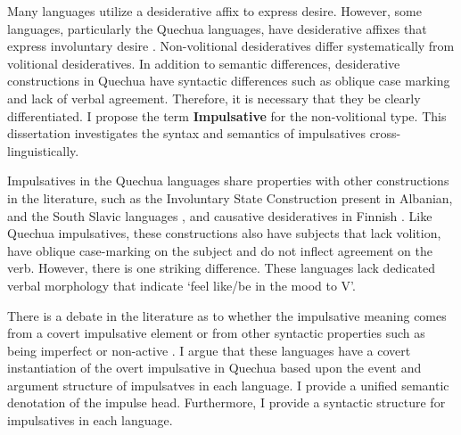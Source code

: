 \begin{front}



Many languages utilize a desiderative affix to express desire. However, some languages, particularly the Quechua languages, have desiderative affixes that express involuntary desire \citep*{Hermon:1985, Cole:1985, Jake:1978}.  Non-volitional desideratives differ systematically from volitional desideratives.  In addition to semantic differences, desiderative constructions in Quechua have syntactic differences such as   oblique case marking and lack of verbal agreement.  Therefore, it is necessary that they be clearly differentiated.  I propose the term { \bf Impulsative} for the non-volitional type.  This dissertation investigates the syntax and semantics of impulsatives cross-linguistically.  


Impulsatives in the Quechua languages share properties with other constructions in the literature, such as the Involuntary State Construction \citep*{Rivero:2009} present in Albanian\citep*{Kallulli:2006},  and the South Slavic languages \citep*{Murasic:2006, Rivero:2004, Franks:1995}, and causative desideratives in Finnish  \citep*{Pylkkanen:1999}. Like Quechua impulsatives, these constructions also have subjects that lack volition, have oblique case-marking on the subject and do not inflect agreement on the verb.   However, there is one striking difference.  These languages lack dedicated verbal morphology that indicate `feel like/be in the mood to V'. 

  There is a debate in the literature as to whether the impulsative meaning comes from a covert impulsative element \citep*{Murasic:2006} or from other syntactic properties such as being imperfect or non-active \citep*{Rivero:2009, Kallulli:1999b}.     I argue that these languages have a covert instantiation of the overt impulsative in Quechua based upon the event and argument structure of impulsatves in each language.    I provide a unified semantic denotation of the impulse head.  Furthermore, I provide a syntactic structure for impulsatives in each language.  


















\end{front}
